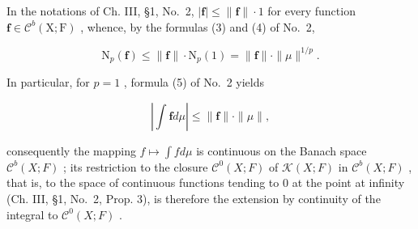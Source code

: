 In the notations of Ch. III, §1, No.~2, \(|\mathbf{f}| \leqslant \| \mathbf{f} \| \cdot 1\) for every function \(\mathbf{f} \in \mathcal{C}^b(\mathrm{X};\mathrm{F})\) , whence, by the formulas (3) and (4) of No.~2,

\[
\mathrm{N} _ {p} (\mathbf {f}) \leqslant \| \mathbf {f} \| \cdot \mathrm{N} _ {p} (1) = \| \mathbf {f} \| \cdot \| \mu \| ^ {1 / p}.\tag{19}
\]

In particular, for \(p = 1\) , formula (5) of No.~2 yields

\[
\left| \int \mathbf {f} d \mu \right| \leqslant \| \mathbf {f} \| \cdot \| \mu \|,\tag{20}
\]

consequently the mapping \(f \mapsto \int f d\mu\) is continuous on the Banach space \(\mathcal{C}^{b}(X;F)\) ; its restriction to the closure \(\mathcal{C}^{0}(X;F)\) of \(\mathcal{K}(X;F)\) in \(\mathcal{C}^{b}(X;F)\) , that is, to the space of continuous functions tending to 0 at the point at infinity (Ch. III, §1, No.~2, Prop. 3), is therefore the extension by continuity of the integral to \(\mathcal{C}^{0}(X;F)\) .
